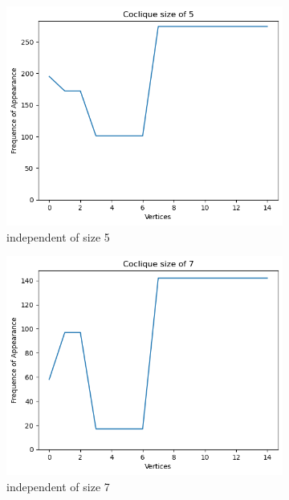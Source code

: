\documentclass{amsart}
\theoremstyle{definition}
\begin{document}
\begin{appendix}
\begin{figure}[hbt!]
\begin{subfigure}[b]{.45\textwidth}
			\centering
			\includegraphics[width=1\linewidth]{images/depth_4_size_5.png}
			\caption{independent of size 5}
		\end{subfigure}
		\begin{subfigure}[b]{.45\textwidth}
			\centering
			\includegraphics[width=1\linewidth]{images/depth_4_size_7.png}
			\caption{independent of size 7}
		\end{subfigure}
		\begin{subfigure}[b]{.45\textwidth}
			\centering

\end{subfigure}
\end{figure}
\end{appendix}
\end{document}
